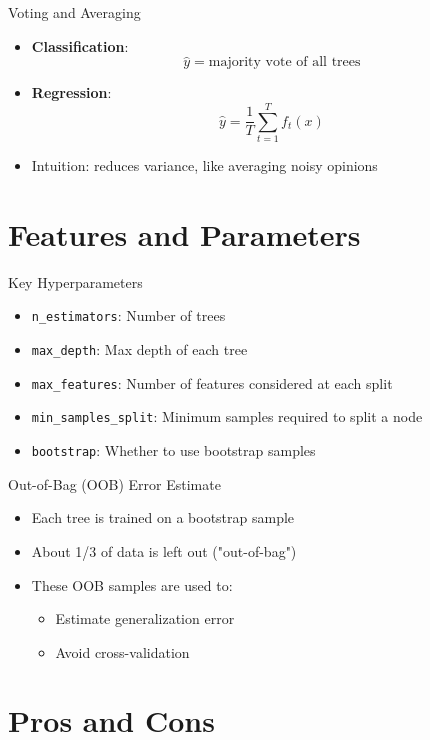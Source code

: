 \documentclass{beamer}
\begin{document}
\begin{frame}{Voting and Averaging}
\begin{itemize}
    \item \textbf{Classification}:
    \[
    \hat{y} = \text{majority vote of all trees}
    \]
    \item \textbf{Regression}:
    \[
    \hat{y} = \frac{1}{T} \sum_{t=1}^{T} f_t(x)
    \]
    \item Intuition: reduces variance, like averaging noisy opinions
\end{itemize}
\end{frame}

\section{Features and Parameters}

\begin{frame}{Key Hyperparameters}
\begin{itemize}
    \item \texttt{n\_estimators}: Number of trees
    \item \texttt{max\_depth}: Max depth of each tree
    \item \texttt{max\_features}: Number of features considered at each split
    \item \texttt{min\_samples\_split}: Minimum samples required to split a node
    \item \texttt{bootstrap}: Whether to use bootstrap samples
\end{itemize}
\end{frame}

\begin{frame}{Out-of-Bag (OOB) Error Estimate}
\begin{itemize}
    \item Each tree is trained on a bootstrap sample
    \item About 1/3 of data is left out ("out-of-bag")
    \item These OOB samples are used to:
    \begin{itemize}
        \item Estimate generalization error
        \item Avoid cross-validation
    \end{itemize}
\end{itemize}
\end{frame}

\section{Pros and Cons}
\end{document}
